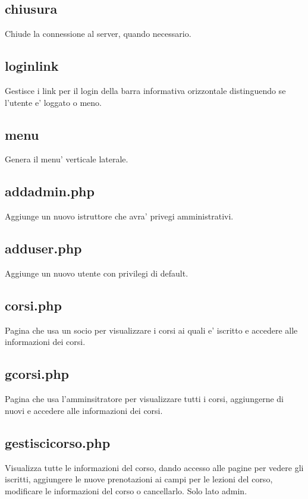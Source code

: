 \subsection{chiusura}
Chiude la connessione al server, quando necessario.

\subsection{loginlink}
Gestisce i link per il login della barra informativa orizzontale distinguendo se l'utente e' loggato o meno.

\subsection{menu}

Genera il menu' verticale laterale.

\subsection{addadmin.php}

Aggiunge un nuovo istruttore che avra' privegi amministrativi.

\subsection{adduser.php}

Aggiunge un nuovo utente con privilegi di default.

\subsection{corsi.php}

Pagina che usa un socio per visualizzare i corsi ai quali e' iscritto e accedere alle informazioni dei corsi.

\subsection{gcorsi.php}

Pagina che usa l'amminsitratore per visualizzare tutti i corsi, aggiungerne di nuovi e accedere alle informazioni dei corsi.

\subsection{gestiscicorso.php}

Visualizza tutte le informazioni del corso, dando accesso alle pagine per vedere gli iscritti, aggiungere le nuove prenotazioni ai campi per le lezioni del corso, modificare le informazioni del corso o cancellarlo. Solo lato admin.

